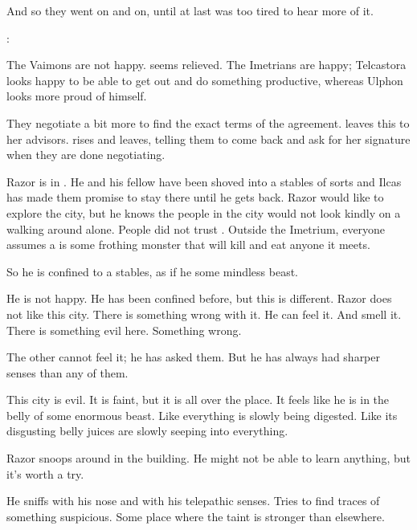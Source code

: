 And so they went on and on, until at last \Tiroco was too tired to hear more of it. 

\Tiroco:

The Vaimons are not happy. 
\Cornel seems relieved. 
The Imetrians are happy; Telcastora looks happy to be able to get out and do something productive, whereas Ulphon looks more proud of himself. 

They negotiate a bit more to find the exact terms of the agreement. 
\Tiroco leaves this to her advisors.
\Tiroco rises and leaves, telling them to come back and ask for her signature when they are done negotiating. 





\begin{comment}
  \section{Razor sees strange stuff}
\end{comment}
\new
Razor is in \Malcur. 
He and his fellow \nycans have been shoved into a stables of sorts and Ilcas has made them promise to stay there until he gets back. 
Razor would like to explore the city, but he knows the people in the city would not look kindly on a \nycan walking around alone. 
People did not trust \nycans. 
Outside the Imetrium, everyone assumes a \nycan is some frothing \wylde monster that will kill and eat anyone it meets. 

So he is confined to a stables, as if he some mindless beast. 

He is not happy. 
He has been confined before, but this is different. 
Razor does not like this city. 
There is something wrong with it. 
He can feel it. 
And smell it. 
There is something evil here. 
Something wrong. 

The other \nycans cannot feel it; he has asked them. 
But he has always had sharper senses than any of them. 

This city is evil. 
It is faint, but it is all over the place. 
It feels like he is in the belly of some enormous beast. 
Like everything is slowly being digested. 
Like its disgusting belly juices are slowly seeping into everything. 

Razor snoops around in the building. 
He might not be able to learn anything, but it's worth a try.

He sniffs with his nose and with his telepathic senses. 
Tries to find traces of something suspicious.
Some place where the taint is stronger than elsewhere. 

